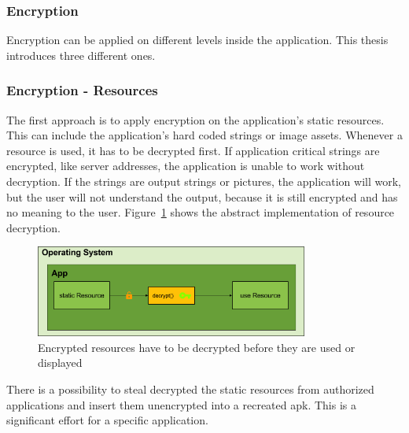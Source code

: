 \subsubsection{Encryption} \label{subsection:counter-replace-encryption-content}
Encryption can be applied on different levels inside the application.
This thesis introduces three different ones.

\subsubsection{Encryption - Resources} \label{subsection:counter-replace-encryption-content-resource}
The first approach is to apply encryption on the application's static resources.
This can include the application's hard coded strings or image assets.
Whenever a resource is used, it has to be decrypted first.
\newline
If application critical strings are encrypted, like server addresses, the application is unable to work without decryption.
If the strings are output strings or pictures, the application will work, but the user will not understand the output, because it is still encrypted and has no meaning to the user.
\newline
Figure~\ref{fig:encryptionResource} shows the abstract implementation of resource decryption.
\begin{figure}[h]
    \centering
    \includegraphics[width=0.8\textwidth]{data/encryptionResource.png}
    \caption{Encrypted resources have to be decrypted before they are used or displayed}
    \label{fig:encryptionResource}
\end{figure}
\newline
There is a possibility to steal decrypted the static resources from authorized applications and insert them unencrypted into a recreated \gls{apk}.
This is a significant effort for a specific application.

